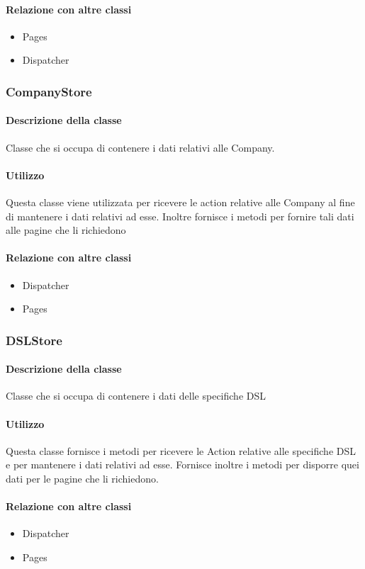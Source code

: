 \paragraph*{Relazione con altre classi}
\begin{itemize}
\item Pages
\item Dispatcher
\end{itemize}

\subsubsection{CompanyStore}
\paragraph*{Descrizione della classe}
Classe che si occupa di contenere i dati relativi alle Company.
\paragraph*{Utilizzo}
Questa classe viene utilizzata per ricevere le action relative alle Company al fine di mantenere i dati relativi ad esse. Inoltre fornisce i metodi per fornire tali dati alle pagine che li richiedono
\paragraph*{Relazione con altre classi}
\begin{itemize}
\item Dispatcher
\item Pages
\end{itemize}

\subsubsection{DSLStore}
\paragraph*{Descrizione della classe}
Classe che si occupa di contenere i dati delle specifiche DSL
\paragraph*{Utilizzo}
Questa classe fornisce i metodi per ricevere le Action relative alle specifiche DSL e per mantenere i dati relativi ad esse. Fornisce inoltre i metodi per disporre quei dati per le pagine che li richiedono.
\paragraph*{Relazione con altre classi}
\begin{itemize}
\item Dispatcher
\item Pages
\end{itemize}


